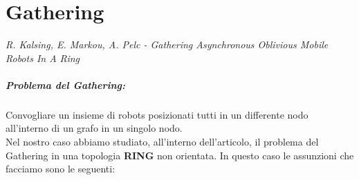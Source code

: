 \chapter{Gathering}
\emph{R. Kalsing, E. Markou, A. Pelc - Gathering Asynchronous Oblivious Mobile Robots In A Ring}

\paragraph{Problema del Gathering:} Convogliare un insieme di robots posizionati
tutti in un differente nodo all'interno di un grafo in un singolo nodo.\\
Nel nostro caso abbiamo studiato, all'interno dell'articolo, il problema del
Gathering in una topologia \textbf{RING} non orientata. In questo caso le
assunzioni che facciamo sono le seguenti:
